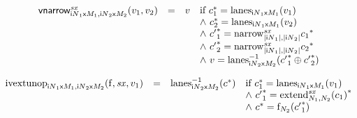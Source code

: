 $$
\begin{array}[t]{@{}lcl@{}l@{}}
{\mathsf{vnarrow}}{{{}_{{{{\mathsf{i}}{N}}_1}{\mathsf{x}}{M_1}, {{{\mathsf{i}}{N}}_2}{\mathsf{x}}{M_2}}^{{\mathit{sx}}}}}{(v_1, v_2)} & = & v & \quad
\begin{array}[t]{@{}l@{}}
\mbox{if}~ {c_1^\ast} = {{\mathrm{lanes}}}_{{{{\mathsf{i}}{N}}_1}{\mathsf{x}}{M_1}}(v_1) \\
{\land}~ {c_2^\ast} = {{\mathrm{lanes}}}_{{{{\mathsf{i}}{N}}_1}{\mathsf{x}}{M_1}}(v_2) \\
{\land}~ {{c'}_1^\ast} = {{{{{\mathrm{narrow}}}_{{|{{\mathsf{i}}{N}}_1|}, {|{{\mathsf{i}}{N}}_2|}}^{{\mathit{sx}}}}}{c_1}^\ast} \\
{\land}~ {{c'}_2^\ast} = {{{{{\mathrm{narrow}}}_{{|{{\mathsf{i}}{N}}_1|}, {|{{\mathsf{i}}{N}}_2|}}^{{\mathit{sx}}}}}{c_2}^\ast} \\
{\land}~ v = {{{{\mathrm{lanes}}}_{{{{\mathsf{i}}{N}}_2}{\mathsf{x}}{M_2}}^{{-1}}}}{({{c'}_1^\ast} \oplus {{c'}_2^\ast})} \\
\end{array} \\
\end{array}
$$

$$
\begin{array}[t]{@{}lcl@{}l@{}}
{{\mathrm{ivextunop}}}_{{{{\mathsf{i}}{N}}_1}{\mathsf{x}}{M_1}, {{{\mathsf{i}}{N}}_2}{\mathsf{x}}{M_2}}({\mathrm{f}}, {\mathit{sx}}, v_1) & = & {{{{\mathrm{lanes}}}_{{{{\mathsf{i}}{N}}_2}{\mathsf{x}}{M_2}}^{{-1}}}}{({c^\ast})} & \quad
\begin{array}[t]{@{}l@{}}
\mbox{if}~ {c_1^\ast} = {{\mathrm{lanes}}}_{{{{\mathsf{i}}{N}}_1}{\mathsf{x}}{M_1}}(v_1) \\
{\land}~ {{c'}_1^\ast} = {{{{{\mathrm{extend}}}_{N_1, N_2}^{{\mathit{sx}}}}}{(c_1)}^\ast} \\
{\land}~ {c^\ast} = {{\mathrm{f}}}_{N_2}({{c'}_1^\ast}) \\
\end{array} \\
\end{array}
$$

